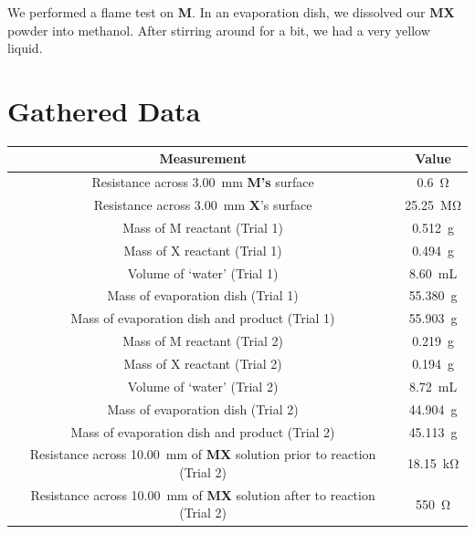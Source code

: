 \documentclass[titlepage]{article}
\begin{document}
\bigskip

We performed a flame test on \textbf{M}. In an evaporation dish, we dissolved our \textbf{MX} powder into methanol. After stirring around for a bit, we had a very yellow liquid. 

\section{Gathered Data}
\begin{tabular}{ |c|c| }
    \hline
    Measurement & Value \\
    \hline
    Resistance across \qty{3.00}{\milli\meter} \textbf{M's} surface & \qty{0.6}{\ohm} \\
    Resistance across \qty{3.00}{\milli\meter} \textbf{X}'s surface & \qty{25.25}{\mega\ohm} \\
    Mass of M reactant (Trial 1) &  \qty{0.512}{\gram}\\
    Mass of X reactant (Trial 1) & \qty{0.494}{\gram} \\
    Volume of `water' (Trial 1) & \qty{8.60}{\milli\liter} \\
    Mass of evaporation dish (Trial 1) & \qty{55.380}{\gram} \\
    Mass of evaporation dish and product (Trial 1) & \qty{55.903}{\gram} \\
    Mass of M reactant (Trial 2) & \qty{0.219}{\gram} \\
    Mass of X reactant (Trial 2) & \qty{0.194}{\gram} \\
    Volume of `water' (Trial 2) & \qty{8.72}{\milli\liter} \\
    Mass of evaporation dish (Trial 2) & \qty{44.904}{\gram} \\
    Mass of evaporation dish and product (Trial 2) & \qty{45.113}{\gram} \\
    Resistance across \qty{10.00}{\milli\meter} of \textbf{MX} solution prior to reaction (Trial 2) & \qty{18.15}{\kilo\ohm} \\
    Resistance across \qty{10.00}{\milli\meter} of \textbf{MX} solution after to reaction (Trial 2) & \qty{550}{\ohm} \\
    \hline
    \end{tabular}
\end{document}
